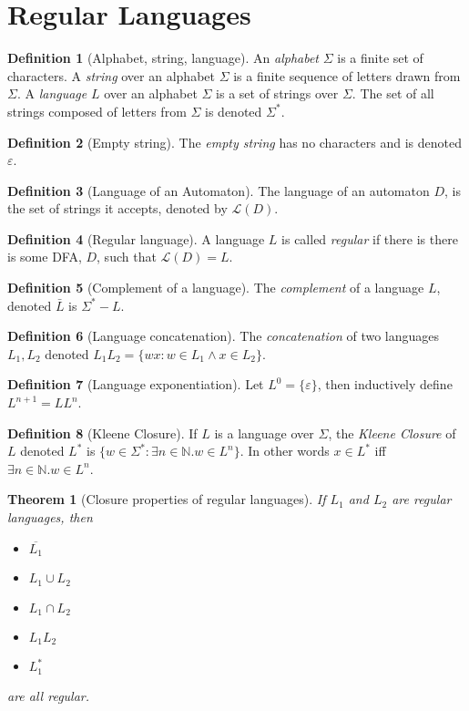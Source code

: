 \documentclass[12pt]{article}
\newtheorem{theorem}{Theorem}[section]
\theoremstyle{definition}
\newtheorem{definition}{Definition}[section]
\begin{document}
\section{Regular Languages}
\begin{definition}[Alphabet, string, language]
    An \emph{alphabet} $\Sigma$ is a finite set of characters. A \emph{string} over an alphabet $\Sigma$ is a finite sequence of letters drawn from $\Sigma$. A \emph{language} $L$ over an alphabet $\Sigma$ is a set of strings over $\Sigma$. The set of all strings composed of letters from $\Sigma$ is denoted $\Sigma^*$.
\end{definition}
\begin{definition}[Empty string]
    The \emph{empty string} has no characters and is denoted $\varepsilon$.
\end{definition}
\begin{definition}[Language of an Automaton]
    The language of an automaton $D$, is the set of strings it accepts, denoted by $\mathcal{L}(D)$.
\end{definition}
\begin{definition}[Regular language]
    A language $L$ is called \emph{regular} if there is there is some DFA, $D$, such that $\mathcal{L}(D) = L$.
\end{definition}
\begin{definition}[Complement of a language]
    The \emph{complement} of a language $L$, denoted $\bar{L}$ is $\Sigma^* - L$.
\end{definition}
\begin{definition}[Language concatenation]
    The \emph{concatenation} of two languages $L_1, L_2$ denoted $L_1L_2 = \{wx : w \in L_1\land x \in L_2\}$.
\end{definition}
\begin{definition}[Language exponentiation]
    Let $L^0 = \{\varepsilon\}$, then inductively define $L^{n+1} = LL^{n}$.
    
\end{definition}
\begin{definition}[Kleene Closure]
    If $L$ is a language over $\Sigma$, the \emph{Kleene Closure} of $L$ denoted $L^*$ is  $\{w \in \Sigma^* : \exists n \in \mathbb{N}. w \in L^n\}$. In other words $x \in L^*$ iff $\exists n \in \mathbb{N}. w \in L^n$.
\end{definition}

\begin{theorem}[Closure properties of regular languages]
    If $L_1$ and $L_2$ are regular languages, then
    \begin{itemize}
        \item $\overline{L_1}$
        \item $L_1 \cup L_2$
        \item $L_1 \cap L_2$
        \item $L_1 L_2$
        \item $L_1^*$
    \end{itemize}
    are all regular.
\end{theorem}
\end{document}
